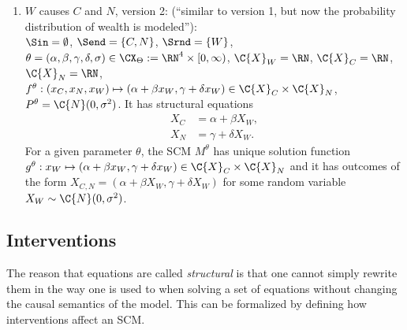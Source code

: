 \begin{Eg}
\begin{enumerate}
\begin{align*}
        X_C^{\doit(x_W)} & = \alpha + \beta x_W, \\
        X_N^{\doit(x_W)} & = \gamma + \delta x_W.
      \end{align*}
      For a given parameter $\theta$, the SCM $M^{\theta}$ has 
      unique solution function $g^\theta : x_W \mapsto (\alpha + \beta x_W, \gamma + \delta x_W) \in \C{X}_C \times \C{X}_N$
      and it has unique potential outcomes of the form $X_{C,N}^{\doit(x_W)} = (\alpha + \beta x_W, \gamma + \delta x_W)$.
    \item $W$ causes $C$ and $N$, version 2: (``similar to version 1, but now the probability distribution of wealth is modeled''):\\
      $\Sin = \emptyset$, $\Send = \{C,N\}$, $\Srnd = \{W\}$, $\theta = (\alpha,\beta,\gamma,\delta,\sigma) \in \CX_\Theta := \RN^4 \times [0,\infty)$, 
      $\C{X}_W = \RN$, $\C{X}_C = \RN$, $\C{X}_N = \RN$, $f^{\theta} : (x_C,x_N,x_W) \mapsto (\alpha + \beta x_W, \gamma + \delta x_W) \in \C{X}_C \times \C{X}_N$, $P^{\theta} = \C{N}(0,\sigma^2)$.
      It has structural  equations
      \begin{align*}
        X_C & = \alpha + \beta X_W, \\
        X_N & = \gamma + \delta X_W.
      \end{align*}
      For a given parameter $\theta$, the SCM $M^{\theta}$ has 
      unique solution function $g^\theta : x_W \mapsto (\alpha + \beta x_W, \gamma + \delta x_W) \in \C{X}_C \times \C{X}_N$ and
      it has outcomes of the form $X_{C,N} = (\alpha + \beta X_W, \gamma + \delta X_W)$ for some random variable $X_W \sim \C{N}(0,\sigma^2)$.
  \end{enumerate}
\end{Eg}

\subsection{Interventions}

The reason that equations  are called \emph{structural} is that one cannot simply rewrite them in the way one is used to when solving a set of equations without changing the causal semantics of the model.
This can be formalized by defining how interventions affect an SCM.


